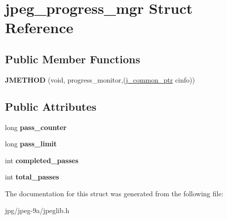 \hypertarget{structjpeg__progress__mgr}{\section{jpeg\+\_\+progress\+\_\+mgr Struct Reference}
\label{structjpeg__progress__mgr}
}
\subsection*{Public Member Functions}
\begin{DoxyCompactItemize}
\item 
\hypertarget{structjpeg__progress__mgr_aa6fbc36158dd82f586d752f976ad7fa3}{{\bfseries J\+M\+E\+T\+H\+O\+D} (void, progress\+\_\+monitor,(\hyperlink{structjpeg__common__struct}{j\+\_\+common\+\_\+ptr} cinfo))}\label{structjpeg__progress__mgr_aa6fbc36158dd82f586d752f976ad7fa3}

\end{DoxyCompactItemize}
\subsection*{Public Attributes}
\begin{DoxyCompactItemize}
\item 
\hypertarget{structjpeg__progress__mgr_ae52d1c89154d3f15ea44f96ee1c4ea7f}{long {\bfseries pass\+\_\+counter}}\label{structjpeg__progress__mgr_ae52d1c89154d3f15ea44f96ee1c4ea7f}

\item 
\hypertarget{structjpeg__progress__mgr_a68ec6ba74838f7b2b8ded8d4c8254c1d}{long {\bfseries pass\+\_\+limit}}\label{structjpeg__progress__mgr_a68ec6ba74838f7b2b8ded8d4c8254c1d}

\item 
\hypertarget{structjpeg__progress__mgr_a0cf4c1c84b2662763053e0eeaca417f3}{int {\bfseries completed\+\_\+passes}}\label{structjpeg__progress__mgr_a0cf4c1c84b2662763053e0eeaca417f3}

\item 
\hypertarget{structjpeg__progress__mgr_a35d61747861f284526a9b312b3dc59ca}{int {\bfseries total\+\_\+passes}}\label{structjpeg__progress__mgr_a35d61747861f284526a9b312b3dc59ca}

\end{DoxyCompactItemize}


The documentation for this struct was generated from the following file\+:\begin{DoxyCompactItemize}
\item 
jpg/jpeg-\/9a/jpeglib.\+h\end{DoxyCompactItemize}
